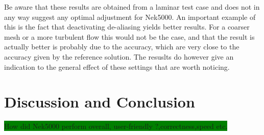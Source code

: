 Be aware that these results are obtained from a laminar test case and does not in any way 
suggest any optimal adjustment for Nek5000. An important example of this is the fact that 
deactivating de-aliasing yields better results. For a coarser mesh or a more turbulent flow 
this would not be the case, and that the result is actually better is probably due to 
the accuracy, which are very close to the accuracy given by the reference solution. 
The resuslts do however give an indication to the general effect of these settings that 
are worth noticing.

\section{Discussion and Conclusion}
\colorbox{green}{How did Nek5000 perform overall, user-friendly ?,correctness,speed etc.}

